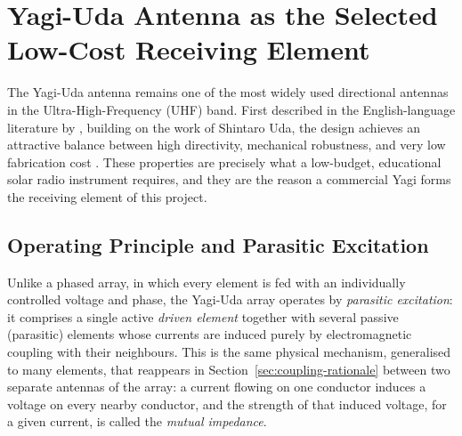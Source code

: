 \section{Yagi-Uda Antenna as the Selected Low-Cost Receiving Element}
\label{sec:yagi-selection}

The Yagi-Uda antenna remains one of the most widely used directional antennas
in the Ultra-High-Frequency (UHF) band. First described in the English-language
literature by \citet{yagi1928}, building on the work of Shintaro Uda, the design
achieves an attractive balance between high directivity, mechanical robustness,
and very low fabrication cost \citep{balanis2016,kraus1988}. These properties
are precisely what a low-budget, educational solar radio instrument requires,
and they are the reason a commercial Yagi forms the receiving element of this
project.

\subsection{Operating Principle and Parasitic Excitation}
\label{subsec:parasitic}

Unlike a phased array, in which every element is fed with an individually
controlled voltage and phase, the Yagi-Uda array operates by
\emph{parasitic excitation}: it comprises a single active \emph{driven
element} together with several passive (parasitic) elements whose currents
are induced purely by electromagnetic coupling with their neighbours. This
is the same physical mechanism, generalised to many elements, that reappears
in Section~\ref{sec:coupling-rationale} between two separate antennas of the
array: a current flowing on one conductor induces a voltage on every nearby
conductor, and the strength of that induced voltage, for a given current, is
called the \emph{mutual impedance}.

